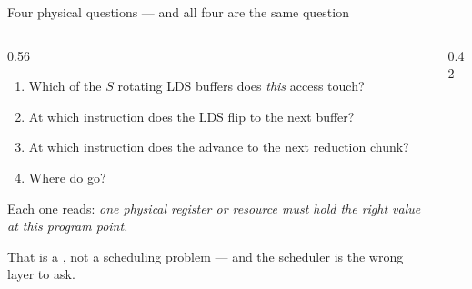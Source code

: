 
\begin{frame}{Four physical questions --- and all four are the same question}
\begin{columns}[T]
\begin{column}{0.56\textwidth}
\begin{enumerate}\scriptsize
  \item Which of the $S$ rotating LDS buffers does \emph{this} access touch?
  \item At which instruction does the LDS  flip to the next buffer?
  \item At which instruction does the  advance to the next reduction chunk?
  \item Where do  go?
\end{enumerate}
\vspace{4pt}
\scriptsize
Each one reads: \emph{one physical register or resource must hold the right value
at this program point.}
\vspace{3pt}

That is a , not a scheduling problem --- and the
scheduler is the wrong layer to ask.
\end{column}
\begin{column}{0.42\textwidth}
\centering
{}
\end{column}
\end{columns}
\end{frame}
